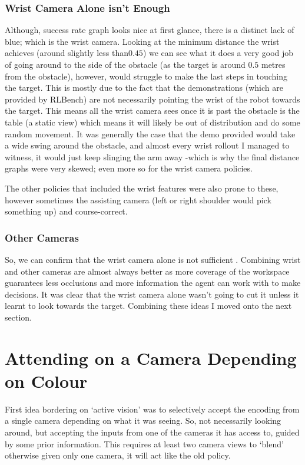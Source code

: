 \subsubsection{Wrist Camera Alone isn't Enough}
Although, success rate graph looks nice at first glance, there is a distinct lack of blue; which is the wrist camera. Looking at the minimum distance the wrist achieves (around slightly less than$0.45$) we can see what it does a very good job of going around to the side of the obstacle (as the target is around $0.5$ metres from the obstacle), however, would struggle to make the last steps in touching the target. This is mostly due to the fact that the demonstrations (which are provided by RLBench) are not necessarily pointing the wrist of the robot towards the target. This means all the wrist camera sees once it is past the obstacle is the table (a static view) which means it will likely be out of distribution and do some random movement. It was generally the case that the demo provided would take a wide swing around the obstacle, and almost every wrist rollout I managed to witness, it would just keep slinging the arm away -which is why the final distance graphs were very skewed; even more so for the wrist camera policies.

The other policies that included the wrist features were also prone to these, however sometimes the assisting camera (left or right shoulder would pick something up) and course-correct.


\subsubsection{Other Cameras}
So, we can confirm that the wrist camera alone is not sufficient . Combining wrist and other cameras are almost always better as more coverage of the workspace guarantees less occlusions and more information the agent can work with to make decisions. It was clear that the wrist camera alone wasn't going to cut it unless it learnt to look towards the target. Combining these ideas I moved onto the next section.

\section{Attending on a Camera Depending on Colour}\label{sec:reach-obs-naive-cam-attn}
First idea bordering on `active vision' was to selectively accept the encoding from a single camera depending on what it was seeing. So, not necessarily looking around, but accepting the inputs from one of the cameras it has access to, guided by some prior information. This requires at least two camera views to `blend' otherwise given only one camera, it will act like the old policy.


